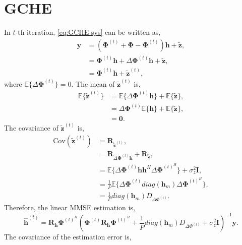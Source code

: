 \documentclass[journal]{IEEEtran}
\begin{document}
\section{GCHE} \label{app:GCHE}
In $t$-th iteration, \eqref{eq:GCHE-sys} can be written as,
\begin{equation}
\begin{split}
\bm y &= (\bm\Phi^{(t)} + \bm\Phi - \bm\Phi^{(t)})\bm h + \tilde{\bm z}, \\
&= \bm\Phi^{(t)}\bm h + \Delta\bm\Phi^{(t)}\bm h + \tilde{\bm z}, \\ 
&= \bm\Phi^{(t)}\bm h + \tilde{\bm z}^{(t)},
\end{split}
\label{eq:GCHE-sys-est-1} 
\end{equation}
where $\mathbb{E}\{\Delta\bm\Phi^{(t)}\}=0$.
The mean of $\tilde{\bm z}^{(t)}$ is,
\begin{equation}
\begin{split}
\mathbb{E}\{\tilde{\bm z}^{(t)}\} &= \mathbb{E}\{ \Delta\bm\Phi^{(t)}\bm h \} + \mathbb{E}\{\tilde{\bm z} \}, \\
& = \Delta\bm\Phi^{(t)} \mathbb{E}\{ \bm h \} + \mathbb{E}\{\tilde{\bm z} \}, \\
&= \bm 0.
\end{split}
\end{equation}
The covariance of $\tilde{\bm z}^{(t)}$ is,
\begin{equation}
\begin{split}
\text{Cov}(\tilde{\bm z}^{(t)}) &= \bm R_{\tilde{\bm z}^{(t)}}, \\
&= \bm R_{\Delta\bm\Phi^{(t)}\bm h} + \bm R_{\tilde{\bm z}}, \\
&= \mathbb{E}\{\Delta\bm\Phi^{(t)}\bm h \bm h^H \Delta\bm\Phi^{(t)^H} \} + \sigma_z^2\bm I, \\
&= \frac{1}{P} \mathbb{E}\{\Delta\bm\Phi^{(t)} diag(\bm h_m) \Delta\bm\Phi^{(t)^H} \}, \\
&= \frac{1}{P} diag(\bm h_m) D_{\Delta \Phi^{(t)}}.
\end{split}
\end{equation}
Therefore, the linear MMSE estimation is,
\begin{dmath}
\hat{\bm h}^{(t)} = \bm R_{\bm h}\bm\Phi^{(t)^H}(\bm \Phi^{(t)}\bm R_{\bm h}\bm\Phi^{(t)^H} + \frac{1}{P} diag(\bm h_m) D_{\Delta \Phi^{(t)}} +\sigma_z^2\bm I)^{-1}\bm y.
\end{dmath}
The covariance of the estimation error is,
\end{document}
